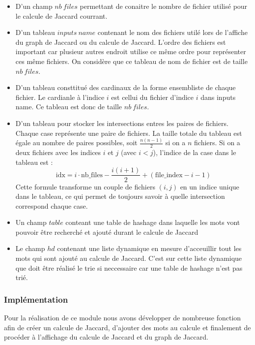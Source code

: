 \documentclass[a4paper, 12pt]{article}
\begin{document}
\begin{itemize}
    \item D'un champ $nb\ files$ permettant de conaitre le nombre de fichier utilisé pour le calcule de Jaccard courrant.
    \item D'un tableau $inputs\ name$ contenant le nom des fichiers utilé lors de l'affiche du graph de Jaccard ou du calcule de Jaccard. L'ordre des fichiers est important car plusieur autres endroit utilise ce même ordre pour représenter ces même fichiers. On considère que ce tableau de nom de fichier est de taille $nb\ files$.
    \item D'un tableau consttitué des cardinaux de la forme ensembliste de chaque fichier. Le cardianle à l'indice $i$ est cellui du fichier d'indice $i$ dans inputs name. Ce tableau est donc de taille $nb \ files$.
    \item D'un tableau pour stocker les intersections entres les paires de fichiers. Chaque case   représente une paire de fichiers. La taille totale du tableau est égale au nombre de paires possibles, soit $\frac{n(n-1)}{2}$ si on a $n$ fichiers.  Si on a deux fichiers avec les indices $i$ et $j$ (avec $i < j$), l’indice de la case dans le tableau est :  
     \[
                    \text{idx} = i \cdot \text{nb\_files} - \frac{i(i + 1)}{2} + (\text{file\_index} - i - 1)
    \]
    Cette formule transforme un couple de fichiers $(i, j)$ en un indice unique dans le tableau, ce qui permet de toujours savoir à quelle intersection correspond chaque case.
    \item Un champ $table$ conteant une table de hashage dans laquelle les mots vont pouvoir être recherché et ajouté durant le calcule de Jaccard
    \item Le champ $hd$ contenant une liste dynamique en mesure d'acceuillir tout les mots qui sont ajouté au calcule de Jaccard. C'est sur cette liste dynamique que doit être réalisé le trie si neccessaire car une table de hashage n'est pas trié.
\end{itemize}

\subsubsection{Implémentation}

Pour la réalisation de ce module nous avons développer de nombreuse fonction afin de créer un calcule de Jaccard, d'ajouter des mots au calcule et finalement de procéder à l'affichage du calcule de Jaccard et du graph de Jaccard.
\end{document}

